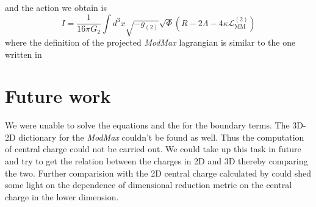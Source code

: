 and the action we obtain is 
\begin{equation}
    I = \frac{1}{16\pi G_2}\int d^3x\sqrt{-g_{(2)}}\sqrt{\Phi}  \left(R - 2\Lambda - 4\kappa\mathcal{L}_{\text{MM}}^{(2)}\right)
\end{equation}
where the definition of the projected \textit{ModMax} lagrangian is similar to the one written in \cite{rathi2023ads2}





\section{Future work}
We were unable to solve the equations and the for the boundary terms. The 3D-2D dictionary for the \textit{ModMax} couldn't be found as well. Thus the computation of central charge could not be carried out. We could take up this task in future and try to get the relation between the charges in 2D and 3D thereby comparing the two. Further comparision with the 2D central charge calculated by \cite{rathi2023ads2} could shed some light on the dependence of dimensional reduction metric on the central charge in the lower dimension. 

